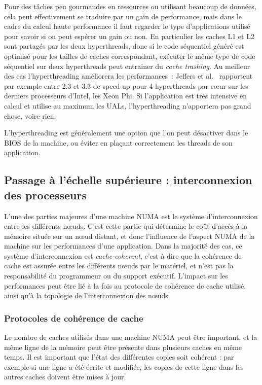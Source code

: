 Pour des tâches peu gourmandes en ressources ou utilisant beaucoup de données, cela peut effectivement se traduire par un gain de performance, mais dans le cadre du calcul haute performance il faut regarder le type d'applications utilisé pour savoir si on peut espérer un gain ou non.
En particulier les caches L1 et L2 sont partagés par les deux hyperthreads, donc si le code séquentiel généré est optimisé pour les tailles de caches correspondant, exécuter le même type de code séquentiel sur deux hyperthreads peut entrainer du \emph{cache trashing}.
Au meilleur des cas l'hyperthreading améliorera les performances~: Jeffers et al.~\cite{Jeffers2016} rapportent par exemple entre 2.3 et 3.3 de speed-up pour 4 hyperthreads par cœur sur les derniers processeurs d'Intel, les Xeon Phi.
Si l'application est très intensive en calcul et utilise au maximum les UALs, l'hyperthreading n'apportera pas grand chose, voire rien.

L'hyperthreading est généralement une option que l'on peut désactiver dans le BIOS de la machine, ou éviter en plaçant correctement les threads de son application.


\subsection{Passage à l'échelle supérieure : interconnexion des processeurs}\label{sec:context:numa:interconnect}

L'une des parties majeures d'une machine NUMA est le système d'interconnexion entre les différents nœuds.
C'est cette partie qui détermine le coût d'accès à la mémoire située sur un nœud distant, et donc l'influence de l'aspect NUMA de la machine sur les performances d'une application.
Dans la majorité des cas, ce système d'interconnexion est \emph{cache-coherent}, c'est à dire que la cohérence de cache est assurée entre les différents nœuds par le matériel, et n'est pas la responsabilité du programmeur ou du support exécutif.
L'impact sur les performances peut être lié à la fois au protocole de cohérence de cache utilisé, ainsi qu'à la topologie de l'interconnexion des nœuds.


\subsubsection{Protocoles de cohérence de cache}

Le nombre de caches utilisés dans une machine NUMA peut être important, et la même ligne de la mémoire peut être présente dans plusieurs caches en même temps.
Il est important que l'état des différentes copies soit cohérent : par exemple si une ligne a été écrite et modifiée, les copies de cette ligne dans les autres caches doivent être mises à jour.

